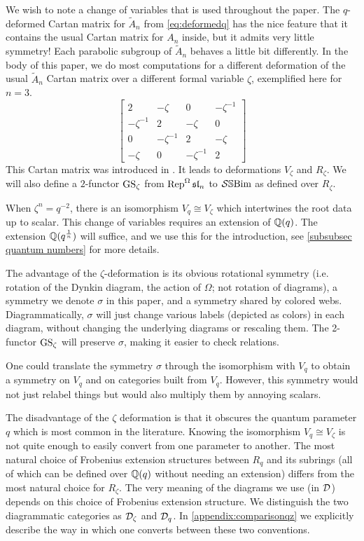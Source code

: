 We wish to note a change of variables that is used throughout the paper. The $q$-deformed Cartan matrix for $\tilde{A}_n$ from \eqref{eq:deformedq} has the nice feature that it contains the usual Cartan matrix for $A_n$ inside, but it admits very little symmetry! Each parabolic subgroup of $\tilde{A}_n$ behaves a little bit differently. In the body of this paper, we do most computations for a different deformation of the usual $\tilde{A}_n$ Cartan matrix over a different formal variable $\zeta$, exemplified here for $n=3$.
\begin{equation} \begin{bmatrix}
    2 &-\zeta &0 &-\zeta^{-1} \\
    -\zeta^{-1} &2 &-\zeta &0 \\
    0 &-\zeta^{-1} &2 &-\zeta \\
    -\zeta & 0 &-\zeta^{-1} &2 
\end{bmatrix}\end{equation}
This Cartan matrix was introduced in \cite{EJY1}. It leads to deformations $V_{\zeta}$ and $R_{\zeta}$. We will also define a $2$-functor $\operatorname{GS}_{\zeta}$ from $\operatorname{Rep}^{\Omega} \mathfrak{sl}_n$ to $\mathcal{S}\mathbb{S}\text{Bim}$ as defined over $R_{\zeta}$. 

When $\zeta^n=q^{-2}$, there is an isomorphism $V_q \cong V_{\zeta}$ which intertwines the root data up to scalar. This change of variables requires an extension of $\mathbb{Q}(q)$. The extension $\mathbb{Q}(q^{\frac{1}{n}})$ will suffice, and we use this for the introduction, see \cref{subsubsec quantum numbers} for more details.

The advantage of the $\zeta$-deformation is its obvious rotational symmetry (i.e. rotation of the Dynkin diagram, the action of $\Omega$; not rotation of diagrams), a symmetry we denote $\sigma$ in this paper, and a symmetry shared by colored webs. Diagrammatically, $\sigma$ will just change various labels (depicted as colors) in each diagram, without changing the underlying diagrams or rescaling them. The 2-functor $\operatorname{GS}_{\zeta}$ will preserve $\sigma$, making it easier to check relations.

\begin{remark} One could translate the symmetry $\sigma$ through the isomorphism with $V_q$ to obtain a symmetry on $V_q$ and on categories built from $V_q$. However, this symmetry would not just relabel things but would also multiply them by annoying scalars. \end{remark}

The disadvantage of the $\zeta$ deformation is that it obscures the quantum parameter $q$ which is most common in the literature. Knowing the isomorphism $V_q \cong V_{\zeta}$ is not quite enough to easily convert from one parameter to another. The most natural choice of Frobenius extension structures between $R_q$ and its subrings (all of which can be defined over $\mathbb{Q}(q)$ without needing an extension) differs from the most natural choice for $R_\zeta$. The very meaning of the diagrams we use (in $\mathcal{D}$) depends on this choice of Frobenius extension structure. We distinguish the two diagrammatic categories as $\mathcal{D}_\zeta$ and $\mathcal{D}_q$. In \cref{appendix:comparisonqz} we explicitly describe the way in which one converts between these two conventions.

